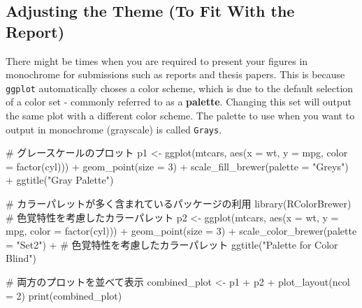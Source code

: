 \documentclass[
  a4paper,
]{book}
\newenvironment{Shaded}{\begin{snugshade}}{\end{snugshade}}
\newcommand{\AttributeTok}[1]{\textcolor[rgb]{0.40,0.45,0.13}{#1}}
\newcommand{\CommentTok}[1]{\textcolor[rgb]{0.37,0.37,0.37}{#1}}
\newcommand{\DecValTok}[1]{\textcolor[rgb]{0.68,0.00,0.00}{#1}}
\newcommand{\FunctionTok}[1]{\textcolor[rgb]{0.28,0.35,0.67}{#1}}
\newcommand{\NormalTok}[1]{\textcolor[rgb]{0.00,0.23,0.31}{#1}}
\newcommand{\OtherTok}[1]{\textcolor[rgb]{0.00,0.23,0.31}{#1}}
\newcommand{\SpecialCharTok}[1]{\textcolor[rgb]{0.37,0.37,0.37}{#1}}
\newcommand{\StringTok}[1]{\textcolor[rgb]{0.13,0.47,0.30}{#1}}
\begin{document}
\subsection{Adjusting the Theme (To Fit With the
Report)}\label{adjusting-the-theme-to-fit-with-the-report}

There might be times when you are required to present your figures in
monochrome for submissions such as reports and thesis papers. This is
because \texttt{ggplot} automatically choses a color scheme, which is
due to the default selection of a color set - commonly referred to as a
\textbf{palette}. Changing this set will output the same plot with a
different color scheme. The palette to use when you want to output in
monochrome (grayscale) is called \texttt{Grays}.

\begin{Shaded}
\begin{Highlighting}[]
\CommentTok{\# グレースケールのプロット}
\NormalTok{p1 }\OtherTok{\textless{}{-}} \FunctionTok{ggplot}\NormalTok{(mtcars, }\FunctionTok{aes}\NormalTok{(}\AttributeTok{x =}\NormalTok{ wt, }\AttributeTok{y =}\NormalTok{ mpg, }\AttributeTok{color =} \FunctionTok{factor}\NormalTok{(cyl))) }\SpecialCharTok{+}
  \FunctionTok{geom\_point}\NormalTok{(}\AttributeTok{size =} \DecValTok{3}\NormalTok{) }\SpecialCharTok{+}
  \FunctionTok{scale\_fill\_brewer}\NormalTok{(}\AttributeTok{palette =} \StringTok{"Greys"}\NormalTok{) }\SpecialCharTok{+}
  \FunctionTok{ggtitle}\NormalTok{(}\StringTok{"Gray Palette"}\NormalTok{)}

\CommentTok{\# カラーパレットが多く含まれているパッケージの利用}
\FunctionTok{library}\NormalTok{(RColorBrewer)}
\CommentTok{\# 色覚特性を考慮したカラーパレット}
\NormalTok{p2 }\OtherTok{\textless{}{-}} \FunctionTok{ggplot}\NormalTok{(mtcars, }\FunctionTok{aes}\NormalTok{(}\AttributeTok{x =}\NormalTok{ wt, }\AttributeTok{y =}\NormalTok{ mpg, }\AttributeTok{color =} \FunctionTok{factor}\NormalTok{(cyl))) }\SpecialCharTok{+}
  \FunctionTok{geom\_point}\NormalTok{(}\AttributeTok{size =} \DecValTok{3}\NormalTok{) }\SpecialCharTok{+}
  \FunctionTok{scale\_color\_brewer}\NormalTok{(}\AttributeTok{palette =} \StringTok{"Set2"}\NormalTok{) }\SpecialCharTok{+} \CommentTok{\# 色覚特性を考慮したカラーパレット}
  \FunctionTok{ggtitle}\NormalTok{(}\StringTok{"Palette for Color Blind"}\NormalTok{)}

\CommentTok{\# 両方のプロットを並べて表示}
\NormalTok{combined\_plot }\OtherTok{\textless{}{-}}\NormalTok{ p1 }\SpecialCharTok{+}\NormalTok{ p2 }\SpecialCharTok{+} \FunctionTok{plot\_layout}\NormalTok{(}\AttributeTok{ncol =} \DecValTok{2}\NormalTok{)}
\FunctionTok{print}\NormalTok{(combined\_plot)}
\end{Highlighting}
\end{Shaded}
\end{document}
